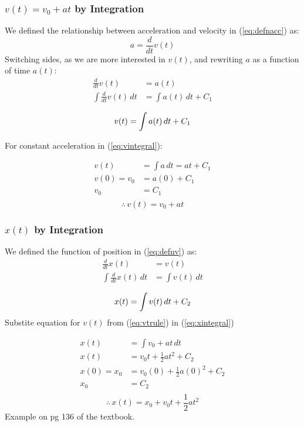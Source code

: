 \documentclass{article}
\numberwithin{equation}{section}
\begin{document}
 \subsubsection{$v(t) = v_{0}+at$ by Integration}
 We defined the relationship between acceleration and velocity in
 (\ref{eq:defnacc}) as:
 \[
     a = \frac{d}{dt}v(t)
\] 
Switching sides, as we are more interested in $v(t)$, and rewriting $a$ as a
function of time $a(t)$:
\[
  \begin{aligned}
    \frac{d}{dt}v(t) &= a(t) \\
    \int \frac{d}{dt}v(t) \,dt &= \int a(t) \,dt + C_{1} \\
  \end{aligned}
\]
\begin{equation}\label{eq:vintegral}
  v(t) = \int a(t) \,dt + C_{1} \\ 
\end{equation}
 
For constant acceleration in (\ref{eq:vintegral}):
 
\[
  \begin{aligned}
    v(t) &= \int a \,dt = at + C_{1}\\
    v(0) = v_{0} &= a(0) + C_{1}\\ 
    v_{0} &= C_{1}\\ 
  \end{aligned}
\]
\begin{equation}\label{eq:vtrule}
  \therefore \, \boxed{v(t) = v_{0}+at}
\end{equation}

 \subsubsection{$x(t)$ by Integration}
 We defined the function of position in (\ref{eq:defnv}) as:
\[
  \begin{aligned}
    \frac{d}{dt}x(t) &= v(t) \\
    \int \frac{d}{dt}x(t) \,dt &= \int v(t) \,dt \\
  \end{aligned}
\]
\begin{equation}\label{eq:xintegral}
  x(t) = \int v(t) \,dt + C_{2} \\ 
\end{equation}
Substite equation for $v(t)$ from (\ref{eq:vtrule}) in (\ref{eq:xintegral})
 
\[
  \begin{aligned}
    x(t) &= \int v_{0}+at \,dt \\
    x(t) &= v_{0}t + \frac{1}{2}at^2 + C_{2} \\
    x(0) = x_{0} &= v_{0}(0) + \frac{1}{2}a(0)^2 + C_{2}\\
    x_{0} &= C_{2} \\
  \end{aligned}
\]
\begin{equation}
  \therefore \, \boxed{    x(t) = x_{0}+v_{0}t + \frac{1}{2}at^2}
\end{equation}
Example on pg 136 of the textbook.
\end{document}

